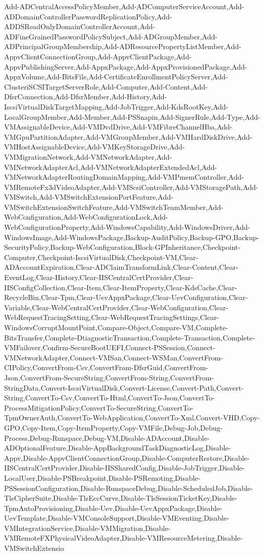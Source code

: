{{		Add-ADCentralAccessPolicyMember,Add-ADComputerServiceAccount,Add-ADDomainControllerPasswordReplicationPolicy,Add-ADDSReadOnlyDomainControllerAccount,Add-ADFineGrainedPasswordPolicySubject,Add-ADGroupMember,Add-ADPrincipalGroupMembership,Add-ADResourcePropertyListMember,Add-AppvClientConnectionGroup,Add-AppvClientPackage,Add-AppvPublishingServer,Add-AppxPackage,Add-AppxProvisionedPackage,Add-AppxVolume,Add-BitsFile,Add-CertificateEnrollmentPolicyServer,Add-ClusteriSCSITargetServerRole,Add-Computer,Add-Content,Add-DfsrConnection,Add-DfsrMember,Add-History,Add-IscsiVirtualDiskTargetMapping,Add-JobTrigger,Add-KdsRootKey,Add-LocalGroupMember,Add-Member,Add-PSSnapin,Add-SignerRule,Add-Type,Add-VMAssignableDevice,Add-VMDvdDrive,Add-VMFibreChannelHba,Add-VMGpuPartitionAdapter,Add-VMGroupMember,Add-VMHardDiskDrive,Add-VMHostAssignableDevice,Add-VMKeyStorageDrive,Add-VMMigrationNetwork,Add-VMNetworkAdapter,Add-VMNetworkAdapterAcl,Add-VMNetworkAdapterExtendedAcl,Add-VMNetworkAdapterRoutingDomainMapping,Add-VMPmemController,Add-VMRemoteFx3dVideoAdapter,Add-VMScsiController,Add-VMStoragePath,Add-VMSwitch,Add-VMSwitchExtensionPortFeature,Add-VMSwitchExtensionSwitchFeature,Add-VMSwitchTeamMember,Add-WebConfiguration,Add-WebConfigurationLock,Add-WebConfigurationProperty,Add-WindowsCapability,Add-WindowsDriver,Add-WindowsImage,Add-WindowsPackage,Backup-AuditPolicy,Backup-GPO,Backup-SecurityPolicy,Backup-WebConfiguration,Block-GPInheritance,Checkpoint-Computer,Checkpoint-IscsiVirtualDisk,Checkpoint-VM,Clear-ADAccountExpiration,Clear-ADClaimTransformLink,Clear-Content,Clear-EventLog,Clear-History,Clear-IISCentralCertProvider,Clear-IISConfigCollection,Clear-Item,Clear-ItemProperty,Clear-KdsCache,Clear-RecycleBin,Clear-Tpm,Clear-UevAppxPackage,Clear-UevConfiguration,Clear-Variable,Clear-WebCentralCertProvider,Clear-WebConfiguration,Clear-WebRequestTracingSetting,Clear-WebRequestTracingSettings,Clear-WindowsCorruptMountPoint,Compare-Object,Compare-VM,Complete-BitsTransfer,Complete-DtiagnosticTransaction,Complete-Transaction,Complete-VMFailover,Confirm-SecureBootUEFI,Connect-PSSession,Connect-VMNetworkAdapter,Connect-VMSan,Connect-WSMan,ConvertFrom-CIPolicy,ConvertFrom-Csv,ConvertFrom-DfsrGuid,ConvertFrom-Json,ConvertFrom-SecureString,ConvertFrom-String,ConvertFrom-StringData,Convert-IscsiVirtualDisk,Convert-License,Convert-Path,Convert-String,ConvertTo-Csv,ConvertTo-Html,ConvertTo-Json,ConvertTo-ProcessMitigationPolicy,ConvertTo-SecureString,ConvertTo-TpmOwnerAuth,ConvertTo-WebApplication,ConvertTo-Xml,Convert-VHD,Copy-GPO,Copy-Item,Copy-ItemProperty,Copy-VMFile,Debug-Job,Debug-Process,Debug-Runspace,Debug-VM,Disable-ADAccount,Disable-ADOptionalFeature,Disable-AppBackgroundTaskDiagnosticLog,Disable-Appv,Disable-AppvClientConnectionGroup,Disable-ComputerRestore,Disable-IISCentralCertProvider,Disable-IISSharedConfig,Disable-JobTrigger,Disable-LocalUser,Disable-PSBreakpoint,Disable-PSRemoting,Disable-PSSessionConfiguration,Disable-RunspaceDebug,Disable-ScheduledJob,Disable-TlsCipherSuite,Disable-TlsEccCurve,Disable-TlsSessionTicketKey,Disable-TpmAutoProvisioning,Disable-Uev,Disable-UevAppxPackage,Disable-UevTemplate,Disable-VMConsoleSupport,Disable-VMEventing,Disable-VMIntegrationService,Disable-VMMigration,Disable-VMRemoteFXPhysicalVideoAdapter,Disable-VMResourceMetering,Disable-VMSwitchExtensio}}
